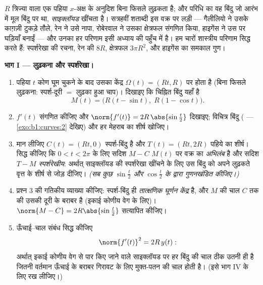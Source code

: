 \begin{problem}\label{pb:b1:curves:1}
$R$ त्रिज्या वाला एक पहिया $x$-अक्ष के अनुदिश बिना फिसले लुढ़कता है; और
परिधि का वह बिंदु जो आरंभ में मूल बिंदु पर था, \emph{साइक्लॉयड} खींचता है।
सत्रहवीं शताब्दी इस वक्र पर लड़ी --- गैलीलियो ने उसके काग़ज़ी टुकड़े तौले,
रेन ने उसे नापा, रोबेरवाल ने उसका क्षेत्रफल संगणित किया, हाइगेंस ने उस पर
घड़ियाँ बनाईं --- और उनका हर परिणाम इसी अध्याय की पहुँच में है। हम चारों
शास्त्रीय परिणाम सिद्ध करते हैं: स्पर्शरेखा की रचना, रेन की  $8R$,
क्षेत्रफल $3\pi R^2$, और हाइगेंस का समकाल गुण।

\medskip \noindent\textbf{भाग I --- लुढ़कना और स्पर्शरेखा।}
\begin{enumerate}
  \item पहिया $t$ कोण घूम चुकने के बाद उसका केंद्र $\Omega(t) = (Rt, R)$ पर
  होता है (बिना फिसले लुढ़कना: स्पर्श-दूरी $=$ लुढ़का हुआ चाप)। दिखाइए कि
  चिह्नित बिंदु यहाँ है
        \[
        M(t) = \bigl(R(t - \sin t),\; R(1 - \cos t)\bigr).
        \]
  \item $f'(t)$ संगणित कीजिए और $\norm{f'(t)} = 2R\,\abs{\sin\frac t2}$
  दिखाइए; विचित्र बिंदु ( --- \cref{exo:b1:curves:2} देखिए) और हर
  मेहराब का शीर्ष खोजिए।
  \item मान लीजिए $C(t) = (Rt, 0)$ स्पर्श-बिंदु है और $T(t) = (Rt, 2R)$
  पहिये का शीर्ष। सिद्ध कीजिए कि $0 < t < 2\pi$ के लिए सदिश $M - C$ $M(t)$
  पर वक्र का \emph{अभिलंब} है और सदिश $T - M$ \emph{स्पर्शरेखीय}: अर्थात्
  साइक्लॉयड की स्पर्शरेखा खींचने के लिए उस बिंदु को अपने लुढ़कते वृत्त के
  शीर्ष से जोड़ दीजिए। \emph{(सब कुछ $\sin\frac t2$ और $\cos\frac t2$ के
  द्वारा गुणनखंडित कीजिए।)}
  \item प्रश्न 3 की गतिकीय व्याख्या कीजिए: स्पर्श-बिंदु ही \emph{तात्क्षणिक
  घूर्णन केंद्र} है, और $M$ की चाल $C$ तक की उसकी दूरी के बराबर है (इकाई
  कोणीय वेग के लिए)। $\norm{M - C} = 2R\abs{\sin\frac t2}$ सत्यापित कीजिए।
  \item ऊँचाई--चाल संबंध सिद्ध कीजिए
        \[
        \norm{f'(t)}^2 = 2R\,y(t) :
        \]
        अर्थात् इकाई कोणीय वेग से पार किए जाने वाले साइक्लॉयड पर हर बिंदु की
        चाल ठीक उतनी ही है जितनी वर्तमान ऊँचाई के बराबर गिरावट के लिए
        मुक्त-पतन की चाल होती है। (इसे भाग IV के लिए रख लीजिए।)
\end{enumerate}


\end{problem}
